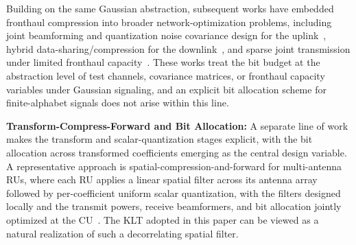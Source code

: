 \documentclass[10pt, twocolumn, comsoc]{IEEEtran}
\begin{document}
Building on the same Gaussian abstraction, subsequent works have embedded fronthaul compression into broader network-optimization problems, including joint beamforming and quantization noise covariance design for the uplink~\cite{zhou2016fronthaul}, hybrid data-sharing/compression for the downlink~\cite{patil2018hybrid}, and sparse joint transmission under limited fronthaul capacity~\cite{han2022sparse}. These works treat the bit budget at the abstraction level of test channels, covariance matrices, or fronthaul capacity variables under Gaussian signaling, and an explicit bit allocation scheme for finite-alphabet signals does not arise within this line.





{\bf{Transform-Compress-Forward and Bit Allocation:}}
A separate line of work makes the transform and scalar-quantization stages explicit, with the bit allocation across transformed coefficients emerging as the central design variable. 
A representative approach is spatial-compression-and-forward for multi-antenna RUs, where each RU applies a linear spatial filter across its antenna array followed by per-coefficient uniform scalar quantization, with the filters designed locally and the transmit powers, receive beamformers, and bit allocation jointly optimized at the CU~\cite{liu2015optimized}. The KLT adopted in this paper can be viewed as a natural realization of such a decorrelating spatial filter.
\end{document}
